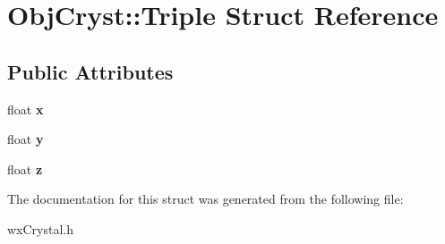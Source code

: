 \hypertarget{struct_obj_cryst_1_1_triple}{}\section{Obj\+Cryst\+::Triple Struct Reference}
\label{struct_obj_cryst_1_1_triple}
\subsection*{Public Attributes}
\begin{DoxyCompactItemize}
\item 
\mbox{\label{struct_obj_cryst_1_1_triple_aa4b4ea87e749e208deecff103cc677a9}} 
float {\bfseries x}
\item 
\mbox{\label{struct_obj_cryst_1_1_triple_a75a56e6111d8f85d89f72a0c3a9cfe10}} 
float {\bfseries y}
\item 
\mbox{\label{struct_obj_cryst_1_1_triple_a79ae71159144f1f26700e1b54161be0e}} 
float {\bfseries z}
\end{DoxyCompactItemize}


The documentation for this struct was generated from the following file\+:\begin{DoxyCompactItemize}
\item 
wx\+Crystal.\+h\end{DoxyCompactItemize}
